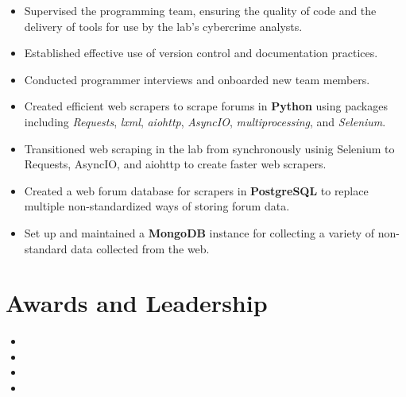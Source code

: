 \documentclass[10pt]{setzerresume}
\begin{document}
  \begin{itemize}[nosep]%

    \item Supervised the programming team, ensuring the quality of code and the delivery of tools for use by the lab's cybercrime analysts.
    \item Established effective use of version control and documentation practices.
    \item Conducted programmer interviews and onboarded new team members.
    \item Created efficient web scrapers to scrape forums in \textbf{Python} using packages including \textit{Requests}, \textit{lxml}, \textit{aiohttp}, \textit{AsyncIO}, \textit{multiprocessing}, and \textit{Selenium}.
    \item Transitioned web scraping in the lab from synchronously usinig Selenium to Requests, AsyncIO, and aiohttp to create faster web scrapers.
    \item Created a web forum database for scrapers in \textbf{PostgreSQL} to replace multiple non-standardized ways of storing forum data.
    \item Set up and maintained a \textbf{MongoDB} instance for collecting a variety of non-standard data collected from the web.
          
  \end{itemize}






  \section{Awards and Leadership}

  \begin{itemize}
    \item {}
    \item {}
    \item {} %
    \item {}
  \end{itemize}

\end{document}
